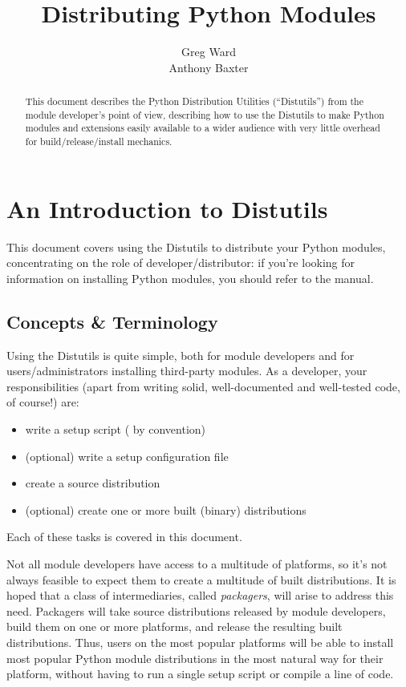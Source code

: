 \documentclass{manual}
\title{Distributing Python Modules}
\author{Greg Ward\\
        Anthony Baxter}
\begin{document}
\maketitle



\begin{abstract}
  \noindent
  This document describes the Python Distribution Utilities
  (``Distutils'') from the module developer's point of view, describing
  how to use the Distutils to make Python modules and extensions easily
  available to a wider audience with very little overhead for
  build/release/install mechanics.
\end{abstract}

%
\tableofcontents


\chapter{An Introduction to Distutils}
\label{intro}

This document covers using the Distutils to distribute your Python
modules, concentrating on the role of developer/distributor: if
you're looking for information on installing Python modules, you
should refer to the  manual.


\section{Concepts \& Terminology}
\label{concepts}

Using the Distutils is quite simple, both for module developers and for
users/administrators installing third-party modules.  As a developer,
your responsibilities (apart from writing solid, well-documented and
well-tested code, of course!) are:
\begin{itemize}
\item write a setup script ( by convention)
\item (optional) write a setup configuration file
\item create a source distribution
\item (optional) create one or more built (binary) distributions
\end{itemize}
Each of these tasks is covered in this document.

Not all module developers have access to a multitude of platforms, so
it's not always feasible to expect them to create a multitude of built
distributions.  It is hoped that a class of intermediaries, called
\emph{packagers}, will arise to address this need.  Packagers will take
source distributions released by module developers, build them on one or
more platforms, and release the resulting built distributions.  Thus,
users on the most popular platforms will be able to install most popular
Python module distributions in the most natural way for their platform,
without having to run a single setup script or compile a line of code.
\end{document}

